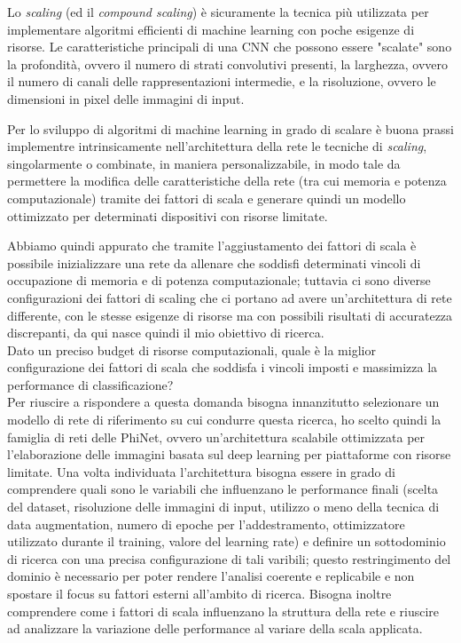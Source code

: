 Lo \textit{scaling} (ed il \textit{compound scaling}) è sicuramente la tecnica più utilizzata per implementare algoritmi efficienti di machine learning con poche esigenze di risorse. Le caratteristiche principali di una CNN che possono essere "scalate" sono la profondità, ovvero il numero di strati convolutivi presenti, la larghezza, ovvero il numero di canali delle rappresentazioni intermedie, e la risoluzione, ovvero le dimensioni in pixel delle immagini di input.

Per lo sviluppo di algoritmi di machine learning in grado di scalare è buona prassi implementre intrinsicamente nell'architettura della rete le tecniche di \textit{scaling}, singolarmente o combinate, in maniera personalizzabile, in modo tale da permettere la modifica delle caratteristiche della rete (tra cui memoria e potenza computazionale) tramite dei fattori di scala e generare quindi un modello ottimizzato per determinati dispositivi con risorse limitate. 

Abbiamo quindi appurato che tramite l'aggiustamento dei fattori di scala è possibile inizializzare una rete da allenare che soddisfi determinati vincoli di occupazione di memoria e di potenza computazionale; tuttavia ci sono diverse configurazioni dei fattori di scaling che ci portano ad avere un'architettura di rete differente, con le stesse esigenze di risorse ma con possibili risultati di accuratezza discrepanti, da qui nasce quindi il mio obiettivo di ricerca. \\

Dato un preciso budget di risorse computazionali, quale è la miglior configurazione dei fattori di scala che soddisfa i vincoli imposti e massimizza la performance di classificazione? \\

Per riuscire a rispondere a questa domanda bisogna innanzitutto selezionare un modello di rete di riferimento su cui condurre questa ricerca, ho scelto quindi la famiglia di reti delle PhiNet\cite{10.1145/3510832}, ovvero un'architettura scalabile ottimizzata per l'elaborazione delle immagini basata sul deep learning per piattaforme con risorse limitate.
Una volta individuata l'architettura bisogna essere in grado di comprendere quali sono le variabili che influenzano le performance finali (scelta del dataset, risoluzione delle immagini di input, utilizzo o meno della tecnica di data augmentation,  numero di epoche per l'addestramento, ottimizzatore utilizzato durante il training, valore del learning rate) e definire un sottodominio di ricerca con una precisa configurazione di tali varibili; questo restringimento del dominio è necessario per poter rendere l'analisi coerente e replicabile e non spostare il focus su fattori esterni all'ambito di ricerca. Bisogna inoltre comprendere come i fattori di scala influenzano la struttura della rete e riuscire ad analizzare la variazione delle performance al variare della scala applicata.

